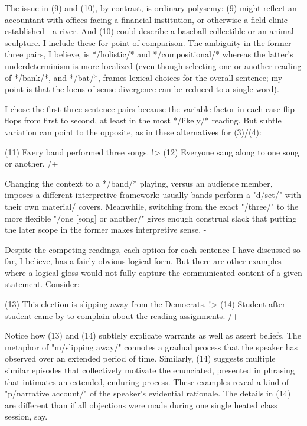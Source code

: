 The issue in (9) and (10), by contrast, is ordinary polysemy: (9) might reflect an 
accountant with offices facing a financial institution, or otherwise a field clinic 
established  -%
a river.  And (10) could describe a baseball collectible or an animal sculpture. 
I include these for point of comparison.  The ambiguity in the former three pairs, 
I believe, is */holistic/* and */compositional/* whereas the latter's underdeterminism 
is more localized (even though selecting one or another reading of */bank/*, and 
*/bat/*, frames lexical choices for the overall sentence; my point is that 
the locus of sense-divergence can be reduced to a single word).  

I chose the first three sentence-pairs because the variable factor in each 
case flip-flops from first to second, at least 
in the most */likely/* reading.  But subtle variation can point to the opposite, as in these alternatives 
for (3)/(4):

(11)  Every band performed three songs. !>
(12)  Everyone sang along to one song or another.
/+

Changing the context to a */band/* playing, versus an audience member, imposes a different interpretive 
framework: usually bands perform a "d/set/" with their own material/ covers.  Meanwhile, switching 
from the exact "/three/" to the more flexible "/one [song] or another/" gives enough construal slack that 
putting the later scope in the former makes interpretive sense.  
 -%

Despite the competing readings, each option for each sentence I have discussed so 
far, I believe, has a fairly obvious logical form.  But there are other examples where a logical 
gloss would not fully capture the communicated content of a given statement.  Consider: 

(13)  This election is slipping away from the Democrats. !>
(14)  Student after student came by to complain about the reading assignments.
/+

Notice how (13) and (14) subtlely explicate warrants as well as assert beliefs.  
The metaphor of "m/slipping away/" connotes a 
gradual process that the speaker has observed over an extended period of time.  Similarly, 
(14) suggests multiple similar episodes that collectively motivate the enunciated, 
presented in phrasing that intimates an extended, 
enduring process.  These examples reveal a kind of "p/narrative account/" of the speaker's evidential 
rationale.  The details in (14) are different than if all objections were made during one 
single heated class session, say.  

